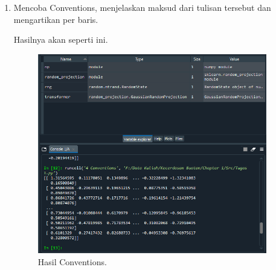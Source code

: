 \begin{enumerate}
	\item Mencoba Conventions, menjelaskan maksud dari tulisan tersebut dan mengartikan per baris.
	
	
	Hasilnya akan seperti ini.
	\begin{figure}[H]
		\includegraphics[width=10cm]{figures/1184077/chapter1/praktek/hasil4.PNG}
		\centering
		\caption{Hasil Conventions.}
	\end{figure}

\end{enumerate}

